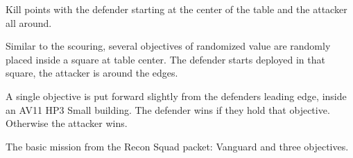 
Kill points with the defender starting at the center of the table and
the attacker all around.



Similar to the scouring, several objectives of randomized value are
randomly placed inside a square at table center.  The defender starts
deployed in that square, the attacker is around the edges.



A single objective is put forward slightly from the defenders leading
edge, inside an AV11 HP3 Small building.  The defender wins if they
hold that objective.  Otherwise the attacker wins.



The basic mission from the Recon Squad packet: Vanguard and three objectives.
